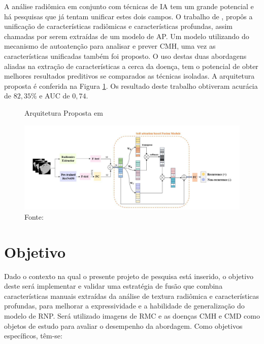A análise radiômica em conjunto com técnicas de \gls{IA} tem um grande potencial e há pesquisas que já tentam unificar estes dois campos. O trabalho de , propôs a unificação de características radiômicas e características profundas, assim chamadas por serem extraídas de um modelo de \gls{AP}. Um modelo utilizando do mecanismo de autoatenção para analisar e prever \gls{CMH}, uma vez as características unificadas também foi proposto. O uso destas duas abordagens aliadas na extração de características a cerca da doença, tem o potencial de obter melhores resultados preditivos se comparados as técnicas isoladas. A arquitetura proposta é conferida na Figura \ref{fig:fig006}. Os resultado deste trabalho obtiveram acurácia de $82,35\%$ e AUC de $0,74$.

\begin{figure}[t!]
    \centering
    \captionsetup{justification=centering}
    \caption{Arquitetura Proposta em }
    \includegraphics[width=1\textwidth]{figures/fig006.png}
    \caption*{Fonte: \cite{aiSelfAttentionBasedFusion2023}}
    \label{fig:fig006}
\end{figure}

\clearpage

\section{Objetivo}
\label{sec:cap1_objetivo}

Dado o contexto na qual o presente projeto de pesquisa está inserido, o objetivo deste será implementar e validar uma estratégia de fusão que combina características manuais extraídas da análise de textura radiômica e características profundas, para melhorar a expressividade e a habilidade de generalização do modelo de \gls{RNP}. Será utilizado imagens de \gls{RMC} e as doenças \gls{CMH} e \gls{CMD} como objetos de estudo para avaliar o desempenho da abordagem. Como objetivos específicos, têm-se:

